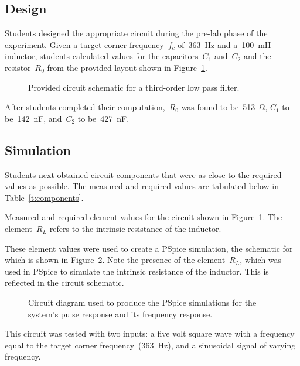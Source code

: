 \subsection{Design}
Students designed the appropriate circuit during the pre-lab phase of the
experiment.  Given a target corner frequency~$f_c$ of~\SI{363}{\hertz} and
a~\SI{100}{\milli\henry} inductor, students calculated values for the
capacitors~$C_1$ and~$C_2$ and the resistor~$R_0$ from the provided layout
shown in Figure~\ref{f:prelabSchem}.
%
\begin{figure}[H]
	\centering
	
	\parbox{.6\textwidth}{
	\caption[Prelab Circuit Diagram]{Provided circuit schematic for a third-order low pass filter.}
	\label{f:prelabSchem}}
\end{figure}
%
After students completed their computation,~$R_0$ was found to
be~\SI{513}{\ohm}, $C_1$ to be~\SI{142}{\nano\farad}, and~$C_2$ to
be~\SI{427}{\nano\farad}.

\subsection{Simulation}
Students next obtained circuit components that were as close to the required
values as possible.  The measured and required values are tabulated below in
Table~\ref{t:components}.
%
\begin{table}[H]
	\centering
	
	\parbox{.6\textwidth}{
	\caption[Required and Measured Element Values]{Measured and required
	element values for the circuit shown in Figure~\ref{f:prelabSchem}.  The
	element~$R_L$ refers to the intrinsic resistance of the inductor.}
	\label{t:components}}
\end{table}
%
These element values were used to create a PSpice simulation, the schematic for
which is shown in Figure~\ref{f:pspiceSchem}.  Note the presence of the
element~$R_L$, which was used in PSpice to simulate the intrinsic resistance of
the inductor.  This is reflected in the circuit schematic.
%
\begin{figure}[H]
	\centering
	
	\parbox{.6\textwidth}{
	\caption[PSpice Circuit Diagram]{Circuit diagram used to produce the PSpice
	simulations for the system's pulse response and its frequency response.}
	\label{f:pspiceSchem}}
\end{figure}
%
This circuit was tested with two inputs: a five volt square wave with a
frequency equal to the target corner frequency~(\SI{363}{\hertz}), and a
sinusoidal signal of varying frequency.

